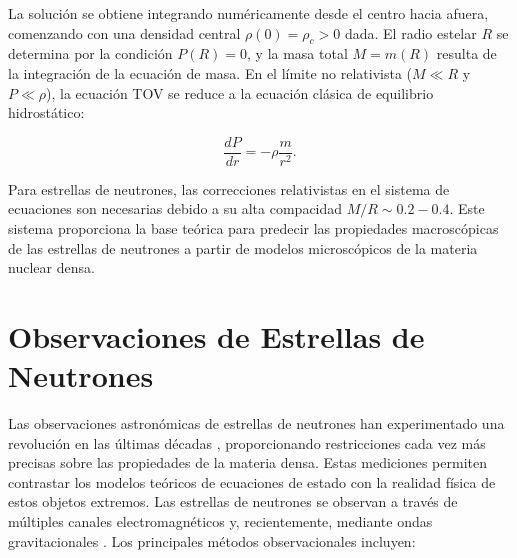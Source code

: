 
La solución se obtiene integrando numéricamente desde el centro hacia afuera, comenzando con una densidad central $\rho(0) = \rho_c > 0$ dada. El radio estelar $R$ se determina por la condición $P(R) = 0$, y la masa total $M = m(R)$ resulta de la integración de la ecuación de masa. En el límite no relativista ($M \ll R$ y $P \ll \rho$), la ecuación TOV se reduce a la ecuación clásica de equilibrio hidrostático:

\begin{equation}
	\frac{dP}{dr} = -\rho \frac{m}{r^2}.
\end{equation}

Para estrellas de neutrones, las correcciones relativistas en el sistema de ecuaciones son necesarias debido a su alta compacidad $M/R \sim 0.2-0.4$. Este sistema proporciona la base teórica para predecir las propiedades macroscópicas de las estrellas de neutrones a partir de modelos microscópicos de la materia nuclear densa.

\section{Observaciones de Estrellas de Neutrones}

Las observaciones astronómicas de estrellas de neutrones han experimentado una revolución en las últimas décadas \cite{pianMergersBinaryNeutron2021}, proporcionando restricciones cada vez más precisas sobre las propiedades de la materia densa. Estas mediciones permiten contrastar los modelos teóricos de ecuaciones de estado con la realidad física de estos objetos extremos. Las estrellas de neutrones se observan a través de múltiples canales electromagnéticos \cite{glendenningCompactStarsNuclear2000} y, recientemente, mediante ondas gravitacionales \cite{fonsecaNANOGravNineyearData2016}. Los principales métodos observacionales incluyen:

